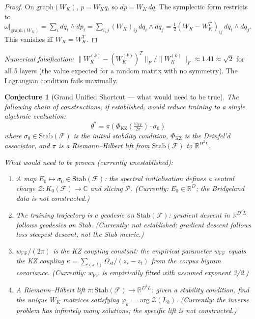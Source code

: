 \documentclass[11pt]{amsart}
\newtheorem{conjecture}[theorem]{Conjecture}
\begin{document}
\begin{proof}
On $\mathrm{graph}(W_K)$, $p = W_K q$, so $dp = W_K\, dq$.
The symplectic form restricts to
$\omega|_{\mathrm{graph}(W_K)} = \sum_i dq_i \wedge dp_i = \sum_{i,j} (W_K)_{ij}\, dq_i \wedge dq_j
= \tfrac{1}{2}(W_K - W_K^T)_{ij}\, dq_i \wedge dq_j$.
This vanishes iff $W_K = W_K^T$.
\end{proof}

\emph{Numerical falsification:}
$\|W_K^{(k)} - (W_K^{(k)})^T\|_F / \|W_K^{(k)}\|_F \approx 1.41 \approx \sqrt{2}$
for all 5 layers (the value expected for a random matrix with no symmetry).
The Lagrangian condition fails maximally.

\begin{conjecture}[Grand Unified Shortcut --- what would need to be true]
\label{conj:grand_unified}
The following chain of constructions, if established, would reduce
training to a single algebraic evaluation:
\[
  \theta^* = \pi\!\left(\Phi_\mathrm{KZ}\!\left(\tfrac{w_\mathrm{FF}}{2\pi}\right) \cdot \sigma_0\right)
\]
where $\sigma_0 \in \mathrm{Stab}(\mathcal{F})$ is the initial stability
condition, $\Phi_\mathrm{KZ}$ is the Drinfel'd associator, and $\pi$
is a Riemann--Hilbert lift from $\mathrm{Stab}(\mathcal{F})$ to $\mathbb{R}^{D^2 L}$.

\emph{What would need to be proven (currently unestablished):}
\begin{enumerate}
\item A map $E_0 \mapsto \sigma_0 \in \mathrm{Stab}(\mathcal{F})$:
  the spectral initialisation defines a central charge
  $\mathcal{Z}: K_0(\mathcal{F}) \to \mathbb{C}$ and slicing $\mathcal{P}$.
  (Currently: $E_0 \in \mathbb{R}^D$; the Bridgeland data is not constructed.)
\item The training trajectory is a geodesic on $\mathrm{Stab}(\mathcal{F})$:
  gradient descent in $\mathbb{R}^{D^2 L}$ follows geodesics on Stab.
  (Currently: not established; gradient descent follows loss steepest descent,
  not the Stab metric.)
\item $w_\mathrm{FF}/(2\pi)$ is the KZ coupling constant:
  the empirical parameter $w_\mathrm{FF}$ equals the KZ coupling
  $\kappa = \sum_{(s,t)} \Omega_{st}/(z_s - z_t)$ from the corpus bigram covariance.
  (Currently: $w_\mathrm{FF}$ is empirically fitted with assumed exponent 3/2.)
\item A Riemann--Hilbert lift $\pi: \mathrm{Stab}(\mathcal{F}) \to \mathbb{R}^{D^2 L}$:
  given a stability condition, find the unique $W_K$ matrices
  satisfying $\varphi_k = \arg \mathcal{Z}(L_k)$.
  (Currently: the inverse problem has infinitely many solutions;
  the specific lift is not constructed.)
\end{enumerate}


\end{conjecture}
\end{document}
